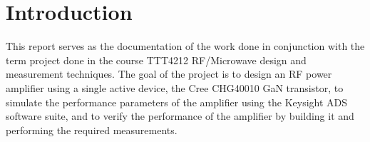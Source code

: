 \chapter{Introduction}
This report serves as the documentation of the work done in conjunction with the term project done in the course TTT4212 RF/Microwave design and measurement techniques. The goal of the project is to design an RF power amplifier using a single active device, the Cree CHG40010 GaN transistor, to simulate the performance parameters of the amplifier using the Keysight ADS software suite, and to verify the performance of the amplifier by building it and performing the required measurements.
